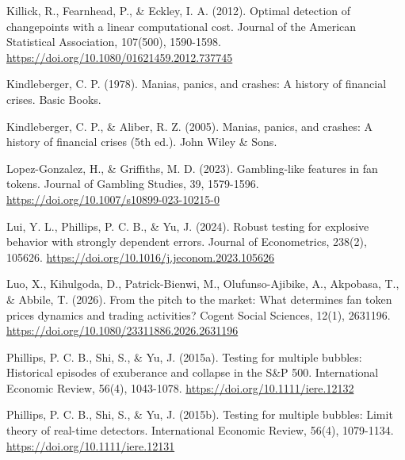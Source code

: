\documentclass[11pt,a4paper,onecolumn]{article}
\newenvironment{reportreference}{\begingroup\small\setlength{\parskip}{5pt}\leftskip=5mm\parindent=-5mm}{\par\endgroup}
\begin{document}
\begin{reportreference}
Killick, R., Fearnhead, P., \& Eckley, I. A. (2012). Optimal detection of changepoints with a linear computational cost. Journal of the American Statistical Association, 107(500), 1590-1598. \url{https://doi.org/10.1080/01621459.2012.737745}
\end{reportreference}

\begin{reportreference}
Kindleberger, C. P. (1978). Manias, panics, and crashes: A history of financial crises. Basic Books.
\end{reportreference}

\begin{reportreference}
Kindleberger, C. P., \& Aliber, R. Z. (2005). Manias, panics, and crashes: A history of financial crises (5th ed.). John Wiley \& Sons.
\end{reportreference}

\begin{reportreference}
Lopez-Gonzalez, H., \& Griffiths, M. D. (2023). Gambling-like features in fan tokens. Journal of Gambling Studies, 39, 1579-1596. \url{https://doi.org/10.1007/s10899-023-10215-0}
\end{reportreference}

\begin{reportreference}
Lui, Y. L., Phillips, P. C. B., \& Yu, J. (2024). Robust testing for explosive behavior with strongly dependent errors. Journal of Econometrics, 238(2), 105626. \url{https://doi.org/10.1016/j.jeconom.2023.105626}
\end{reportreference}

\begin{reportreference}
Luo, X., Kihulgoda, D., Patrick-Bienwi, M., Olufunso-Ajibike, A., Akpobasa, T., \& Abbile, T. (2026). From the pitch to the market: What determines fan token prices dynamics and trading activities? Cogent Social Sciences, 12(1), 2631196. \url{https://doi.org/10.1080/23311886.2026.2631196}
\end{reportreference}

\begin{reportreference}
Phillips, P. C. B., Shi, S., \& Yu, J. (2015a). Testing for multiple bubbles: Historical episodes of exuberance and collapse in the S\&P 500. International Economic Review, 56(4), 1043-1078. \url{https://doi.org/10.1111/iere.12132}
\end{reportreference}

\begin{reportreference}
Phillips, P. C. B., Shi, S., \& Yu, J. (2015b). Testing for multiple bubbles: Limit theory of real-time detectors. International Economic Review, 56(4), 1079-1134. \url{https://doi.org/10.1111/iere.12131}
\end{reportreference}
\end{document}
